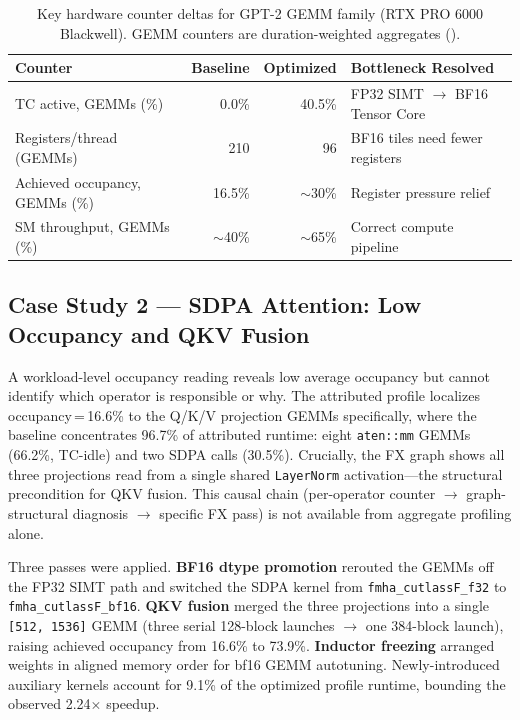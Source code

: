 \begin{table}[h]
\centering
\caption{Key hardware counter deltas for GPT-2 GEMM family (RTX PRO 6000 Blackwell).
  GEMM counters are duration-weighted aggregates ().}
\label{tab:gpt2_counters}
\small
\setlength{\tabcolsep}{4pt}
\begin{tabular}{lrrl}
\toprule
\textbf{Counter} & \textbf{Baseline} & \textbf{Optimized} & \textbf{Bottleneck Resolved} \\
\midrule
TC active, GEMMs (\%)          & 0.0\%        & 40.5\%       & FP32 SIMT $\to$ BF16 Tensor Core \\
Registers/thread (GEMMs)       & 210          & 96           & BF16 tiles need fewer registers \\
Achieved occupancy, GEMMs (\%) & 16.5\%       & ${\sim}$30\% & Register pressure relief \\
SM throughput, GEMMs (\%)      & ${\sim}$40\% & ${\sim}$65\% & Correct compute pipeline \\
\bottomrule
\end{tabular}
\end{table}

\subsection{Case Study 2 --- SDPA Attention: Low Occupancy and QKV Fusion}
\label{sec:cs:sdpa}

A workload-level occupancy reading reveals low average occupancy but cannot identify which
operator is responsible or why.  The attributed profile localizes occupancy\,=\,16.6\% to
the Q/K/V projection GEMMs specifically, where the baseline concentrates 96.7\% of attributed
runtime: eight \texttt{aten::mm} GEMMs (66.2\%, TC-idle) and two SDPA calls (30.5\%).
Crucially, the FX graph shows all three projections read from a single shared
\texttt{LayerNorm} activation---the structural precondition for QKV fusion.  This causal chain
(per-operator counter $\to$ graph-structural diagnosis $\to$ specific FX pass) is not available
from aggregate profiling alone.

Three passes were applied.  \textbf{BF16 dtype promotion} rerouted the GEMMs off the FP32
SIMT path and switched the SDPA kernel from \texttt{fmha\_cutlassF\_f32} to
\texttt{fmha\_cutlassF\_bf16}.  \textbf{QKV fusion} merged the three projections into a
single \texttt{[512, 1536]} GEMM (three serial 128-block launches $\to$ one 384-block launch),
raising achieved occupancy from 16.6\% to 73.9\%.  \textbf{Inductor freezing} arranged
weights in aligned memory order for bf16 GEMM autotuning.  Newly-introduced auxiliary kernels
account for 9.1\% of the optimized profile runtime, bounding the observed 2.24$\times$
speedup.


